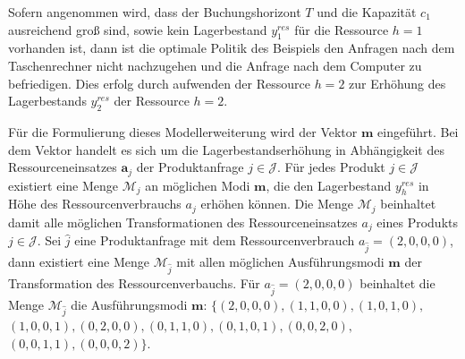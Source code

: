 Sofern angenommen wird, dass der Buchungshorizont $T$ und die Kapazität $c_1$ ausreichend groß sind, sowie kein Lagerbestand $y^{res}_1$ für die Ressource $h=1$ vorhanden ist, dann ist die optimale Politik des Beispiels den Anfragen nach dem Taschenrechner nicht nachzugehen und die Anfrage nach dem Computer zu befriedigen. Dies erfolg durch aufwenden der Ressource $h=2$ zur Erhöhung des Lagerbestands $y^{res}_{2}$ der Ressource $h=2$.

Für die Formulierung dieses Modellerweiterung wird der Vektor $\textbf{m}$ eingeführt. Bei dem Vektor handelt es sich um die Lagerbestandserhöhung in Abhängigkeit des Ressourceneinsatzes $\textbf{a}_{j}$ der Produktanfrage $j\in\mathcal{J}$. Für jedes Produkt $j\in\mathcal{J}$ existiert eine Menge $\mathcal{M}_j$ an möglichen Modi $\textbf{m}$, die den Lagerbestand $y^{res}_h$ in Höhe des Ressourcenverbrauchs $a_{j}$ erhöhen können. Die Menge $\mathcal{M}_j$ beinhaltet damit alle möglichen Transformationen des Ressourceneinsatzes $a_{j}$ eines Produkts $j\in\mathcal{J}$. Sei $\hat{j}$ eine Produktanfrage mit dem Ressourcenverbrauch $a_{\hat{j}}=(2,0,0,0)$, dann existiert eine Menge $\mathcal{M}_{\hat{j}}$ mit allen möglichen Ausführungsmodi $\textbf{m}$ der Transformation des Ressourcenverbauchs. Für $a_{\hat{j}}=(2,0,0,0)$ beinhaltet die Menge $\mathcal{M}_{\hat{j}}$ die Ausführungsmodi $\textbf{m}$: $\{ (2, 0, 0, 0), (1, 1, 0, 0), (1, 0, 1, 0),$ $(1, 0, 0, 1), (0 ,2, 0, 0), (0, 1, 1, 0), (0, 1, 0, 1), (0, 0, 2, 0),$ $(0, 0, 1, 1), (0, 0, 0, 2)\}$.

